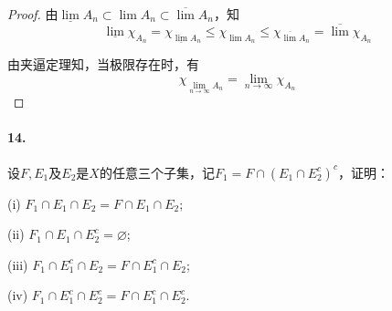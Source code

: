 \documentclass[12pt, a4paper, oneside]{ctexart}
\begin{document}
\begin{proof}
    由$\underline{\lim}A_n\subset\lim A_n\subset \overline{\lim}A_n$，知
    \begin{equation*}
        \underline{\lim}\chi_{A_n} = \chi_{\underline{\lim}A_n}\leqslant\chi_{\lim A_n}\leqslant\chi_{\overline{\lim}A_n}=\overline{\lim}\chi_{A_n}
    \end{equation*}

    由夹逼定理知，当极限存在时，有
    \begin{equation*}
        \chi_{\lim\limits_{n\rightarrow \infty} A_n} =  \lim\limits_{n\rightarrow\infty}\chi_{A_n}
    \end{equation*}

\end{proof}
\paragraph{14.}设$F,E_1$及$E_2$是$X$的任意三个子集，记$F_1=F\cap(E_1\cap E_2^c)^c$，证明：

(i) $F_1\cap E_1\cap E_2=F\cap E_1\cap E_2$;

(ii) $F_1\cap E_1\cap E_2^c=\varnothing$;

(iii) $F_1\cap E_1^c\cap E_2=F\cap E_1^c\cap E_2$;

(iv) $F_1\cap E_1^c\cap E_2^c=F\cap E_1^c\cap E_2^c$.
\end{document}
